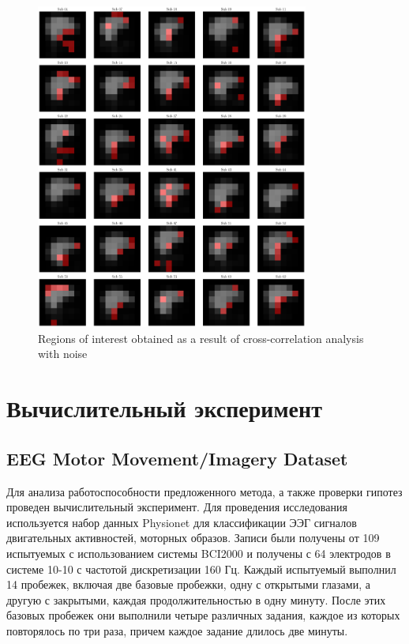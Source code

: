 \documentclass[a4paper, 12pt]{extarticle}
\begin{document}
\begin{figure}[h!]
    \centering
    \includegraphics[width=0.8\textwidth]{cross_correlations_trash.pdf}
    \caption{Regions of interest obtained as a result of cross-correlation analysis with noise}
\end{figure}



\section{Вычислительный эксперимент}
\subsection{EEG Motor Movement/Imagery Dataset}
Для анализа работоспособности предложенного метода, а также проверки гипотез
проведен вычислительный эксперимент.
Для проведения исследования используется набор данных Physionet \citep{schalk2004bci2000, EEG_MI} для классификации ЭЭГ сигналов 
двигательных активностей, моторных образов. 
Записи были получены от 109 испытуемых с использованием системы BCI2000 и получены с 64 электродов в системе 10-10 \citep{seeck2017standardized} 
с частотой дискретизации 160 Гц. 
Каждый испытуемый выполнил 14 пробежек, включая две базовые пробежки, одну с открытыми глазами, а другую с закрытыми, 
каждая продолжительностью в одну минуту. После этих базовых пробежек они выполнили четыре различных задания, каждое из которых повторялось по три раза, 
причем каждое задание длилось две минуты.
 
\end{document}
